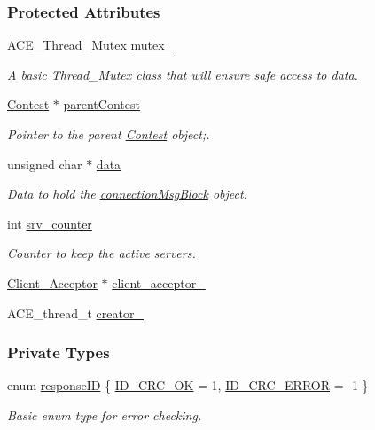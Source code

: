 \subsubsection*{Protected Attributes}
\begin{CompactItemize}
\item 
ACE\_\-Thread\_\-Mutex \hyperlink{classClient__Handler_Client__Handlern0}{mutex\_\-}
\begin{CompactList}\small\item\em A basic Thread\_\-Mutex class that will ensure safe access to data.\item\end{CompactList}\item 
\hyperlink{classContest}{Contest} $\ast$ \hyperlink{classClient__Handler_Client__Handlern1}{parent\-Contest}
\begin{CompactList}\small\item\em Pointer to the parent \hyperlink{classContest}{Contest} object;.\item\end{CompactList}\item 
unsigned char $\ast$ \hyperlink{classClient__Handler_Client__Handlern2}{data}
\begin{CompactList}\small\item\em Data to hold the \hyperlink{classconnectionMsgBlock}{connection\-Msg\-Block} object.\item\end{CompactList}\item 
int \hyperlink{classClient__Handler_Client__Handlern3}{srv\_\-counter}
\begin{CompactList}\small\item\em Counter to keep the active servers.\item\end{CompactList}\item 
\hyperlink{classClient__Acceptor}{Client\_\-Acceptor} $\ast$ \hyperlink{classClient__Handler_Client__Handlern4}{client\_\-acceptor\_\-}
\item 
ACE\_\-thread\_\-t \hyperlink{classClient__Handler_Client__Handlern5}{creator\_\-}
\end{CompactItemize}
\subsubsection*{Private Types}
\begin{CompactItemize}
\item 
enum \hyperlink{classClient__Handler_Client__Handleru2}{response\-ID} \{ \hyperlink{classClient__Handler_Client__Handleru2Client__Handleru0}{ID\_\-CRC\_\-OK} = 1, 
\hyperlink{classClient__Handler_Client__Handleru2Client__Handleru1}{ID\_\-CRC\_\-ERROR} = -1
 \}
\begin{CompactList}\small\item\em Basic enum type for error checking.\item\end{CompactList}\end{CompactItemize}


